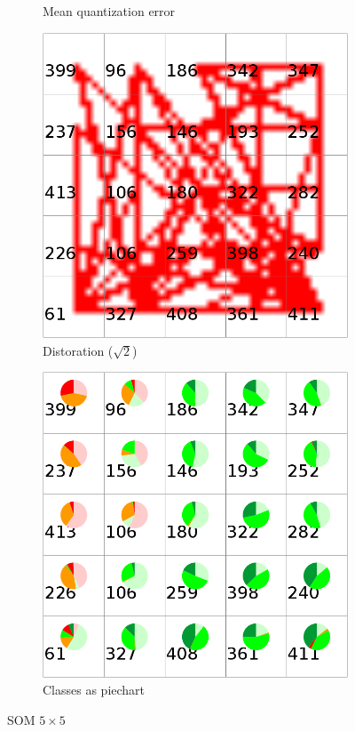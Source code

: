 \documentclass{acm_proc_article-sp}
\begin{document}
\begin{figure}
\begin{subfigure}[b]{0.45\linewidth}
    \caption{Mean quantization error}
    \label{fig:wine-small-mean-quant-error}
\end{subfigure}
\begin{subfigure}[b]{0.45\linewidth}
    \includegraphics[width=\linewidth]{img/wine-small-dist-sqrt-2}
    \caption{Distoration ($\sqrt{2}$)}
    \label{fig:wine-small-dist-sqrt-2}
\end{subfigure}
\begin{subfigure}[b]{0.45\linewidth}
\includegraphics[width=\linewidth]{img/wine-small-pie-cls}
\caption{Classes as piechart}
\label{fig:wine-small-pie-cls}
\end{subfigure}
\caption{SOM $5\times5$}
\end{figure}
\end{document}
